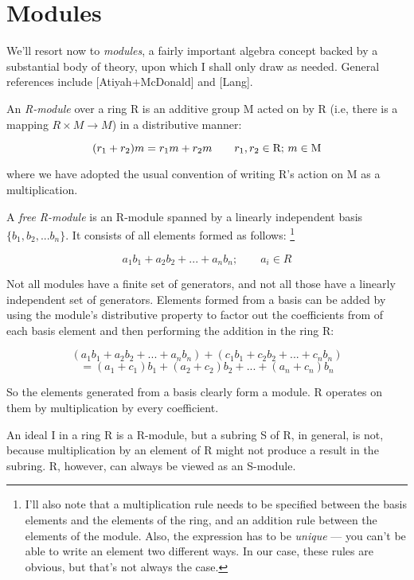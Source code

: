 \section{Modules}

We'll resort now to {\it modules}, a fairly important algebra concept
backed by a substantial body of theory, upon which I shall only draw
as needed.  General references include [Atiyah+McDonald] and [Lang].


An {\it R-module} over a ring R is an additive group M acted on by R
(i.e, there is a mapping $R \times M \to M$) in a distributive manner:

$$(r_1 + r_2)m = r_1 m + r_2 m \qquad r_1, r_2 \in {\rm R};\, m \in {\rm M}$$

where we have adopted the usual convention of writing R's action on M
as a multiplication.

\enddefinition


A {\it free R-module} is an R-module spanned by a linearly independent basis
$\{b_1, b_2, ... b_n\}$.  It consists of all elements formed as follows:
\footnote{I'll also note that a multiplication rule needs to be specified
between the basis elements and the elements of the ring, and an
addition rule between the elements of the module.  Also,
the expression has to be {\it unique} --- you can't be
able to write an element two different ways.  In our
case, these rules are obvious, but that's not always the case.}

	$$ a_1 b_1 + a_2 b_2 + ... + a_n b_n; \qquad a_i \in R $$


\enddefinition

Not all modules have a finite set of generators, and not all those
have a linearly independent set of generators.  Elements formed from a
basis can be added by using the module's distributive property to
factor out the coefficients from of each basis element and then
performing the addition in the ring R:

$$ (a_1 b_1 + a_2 b_2 + ... + a_n b_n) + (c_1 b_1 + c_2 b_2 + ... + c_n b_n) $$
$$  = (a_1 + c_1) b_1 + (a_2 + c_2) b_2 + ... + (a_n + c_n) b_n $$

So the elements generated from a basis clearly form a module.  R operates
on them by multiplication by every coefficient.

\example \quad
\label{sample modules}

An ideal I in a ring R is a R-module, but a subring S of R, in
general, is not, because multiplication by an element of R might not
produce a result in the subring.  R, however, can always be viewed as
an S-module.

